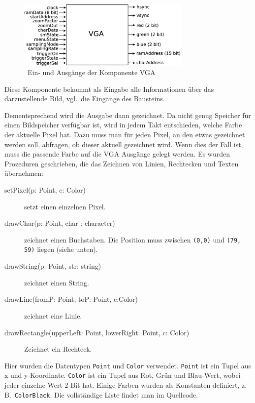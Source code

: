 \documentclass[IN,ngerman,utf8,12pt]{tumbook}
\newcommand{\zB}{z.\,B.\ }
\newcommand{\vgl}{vgl.\ }
\begin{document}
\begin{figure}[H]
    \centerline{
        \includegraphics[width=0.75\textwidth]{img/vga}
    }
    \label{abb:vga}
    \caption{\ Ein- und Ausgänge der Komponente VGA}
\end{figure}

Diese Komponente bekommt als Eingabe alle Informationen über das darzustellende Bild, \vgl die Eingänge des Bausteins.

Dementsprechend wird die Ausgabe dann gezeichnet.
Da nicht genug Speicher für einen Bildspeicher verfügbar ist, wird in jedem Takt entschieden, welche Farbe der aktuelle Pixel hat.
Dazu muss man für jeden Pixel, an den etwas gezeichnet werden soll, abfragen, ob dieser aktuell gezeichnet wird.
Wenn dies der Fall ist, muss die passende Farbe auf die VGA Ausgänge gelegt werden.
Es wurden Prozeduren geschrieben, die das Zeichnen von Linien, Rechtecken und Texten übernehmen:

\begin{description}
    \item[setPixel(p: Point, c: Color)] setzt einen einzelnen Pixel.
    \item[drawChar(p: Point, char : character)] zeichnet einen Buchstaben.
        Die Position muss zwischen \texttt{(0,0)} und \texttt{(79, 59)} liegen (siehe unten).
    \item[drawString(p: Point, str: string)] zeichnet einen String.
    \item[drawLine(fromP: Point, toP: Point, c:Color)] zeichnet eine Linie.
    \item[drawRectangle(upperLeft: Point, lowerRight: Point, c: Color)] Zeichnet ein Rechteck.
\end{description}

Hier wurden die Datentypen \texttt{Point} und \texttt{Color} verwendet.
\texttt{Point} ist ein Tupel aus x und y-Koordinate.
\texttt{Color} ist ein Tupel aus Rot, Grün und Blau-Wert, wobei jeder einzelne Wert 2 Bit hat.
Einige Farben wurden als Konstanten definiert, \zB \texttt{ColorBlack}.
Die vollständige Liste findet man im Quellcode.
\end{document}

